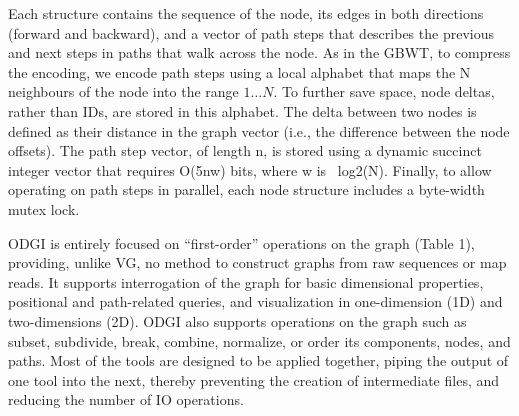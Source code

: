 \documentclass{bioinfo}
\begin{document}


Each structure contains the sequence of the node, its edges in both directions (forward and backward), and a vector of path steps that describes the previous and next steps in paths that walk across the node.
As in the GBWT, to compress the encoding, we encode path steps using a local alphabet that maps the N neighbours of the node into the range $1\ldots N$.
To further save space, node deltas, rather than IDs, are stored in this alphabet.
The delta between two nodes is defined as their distance in the graph vector (i.e., the difference between the node offsets).
The path step vector, of length n, is stored using a dynamic succinct integer vector that requires O(5nw) bits, where w is ~log2(N).
Finally, to allow operating on path steps in parallel, each node structure includes a byte-width mutex lock.

ODGI is entirely focused on “first-order” operations on the graph (Table 1), providing, unlike VG, no method to construct graphs from raw sequences or map reads.
It supports interrogation of the graph for basic dimensional properties, positional and path-related queries, and visualization in one-dimension (1D) and two-dimensions (2D).
ODGI also supports operations on the graph such as subset, subdivide, break, combine, normalize, or order its components, nodes, and paths.
Most of the tools are designed to be applied together, piping the output of one tool into the next, thereby preventing the creation of intermediate files, and reducing the number of IO operations.
\end{document}
